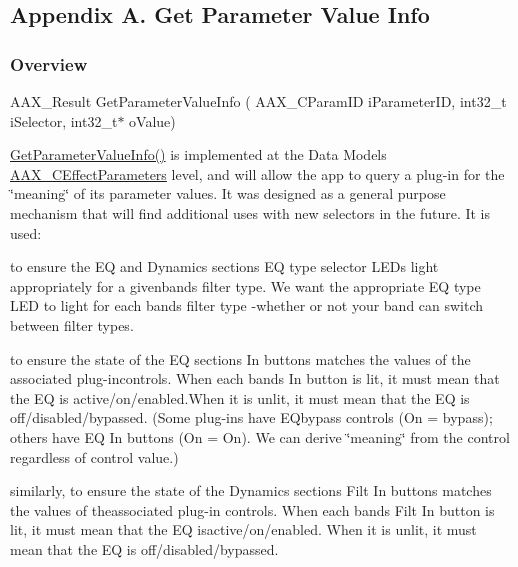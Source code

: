  \hypertarget{a00833_aax_page_table_guide_a_get_parameter_value_info}{}\subsection{Appendix A. Get Parameter Value Info}\label{a00833_aax_page_table_guide_a_get_parameter_value_info}
\hypertarget{a00833_subsection__overview}{}\subsubsection{Overview}\label{a00833_subsection__overview}
{\ttfamily A\+A\+X\+\_\+\+Result Get\+Parameter\+Value\+Info ( A\+A\+X\+\_\+\+C\+Param\+ID i\+Parameter\+ID, int32\+\_\+t i\+Selector, int32\+\_\+t$\ast$ o\+Value)}

\mbox{\hyperlink{a01669_a1702de6d62b5b41b6a8b2f510300392b}{Get\+Parameter\+Value\+Info()}} is implemented at the Data Model\textquotesingle{}s \mbox{\hyperlink{a01481}{A\+A\+X\+\_\+\+C\+Effect\+Parameters}} level, and will allow the app to query a plug-\/in for the \char`\"{}meaning\char`\"{} of its parameter values. It was designed as a general purpose mechanism that will find additional uses with new selectors in the future. It is used\+: 
\begin{DoxyItemize}
\item to ensure the EQ and Dynamics sections\textquotesingle{} EQ type selector L\+E\+Ds light appropriately for a givenband\textquotesingle{}s filter type. We want the appropriate EQ type L\+ED to light for each band\textquotesingle{}s filter type -\/whether or not your band can switch between filter types. 
\item to ensure the state of the EQ section\textquotesingle{}s In buttons matches the values of the associated plug-\/incontrols. When each band\textquotesingle{}s In button is lit, it must mean that the EQ is active/on/enabled.\+When it is unlit, it must mean that the EQ is off/disabled/bypassed. (Some plug-\/ins have E\+Qbypass controls (On = bypass); others have EQ In buttons (On = On). We can derive \char`\"{}meaning\char`\"{} from the control regardless of control value.) 
\item similarly, to ensure the state of the Dynamics section\textquotesingle{}s Filt In buttons matches the values of theassociated plug-\/in controls. When each band\textquotesingle{}s Filt In button is lit, it must mean that the EQ isactive/on/enabled. When it is unlit, it must mean that the EQ is off/disabled/bypassed. 
\end{DoxyItemize}

